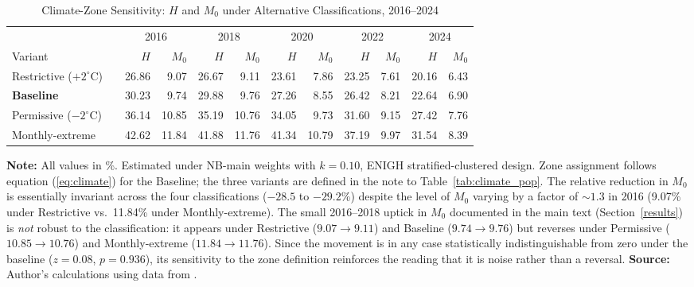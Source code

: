 \documentclass[11pt, a4paper]{article}
\begin{document}
\begin{table}[htb]
\centering
\caption{Climate-Zone Sensitivity: $H$ and $M_0$ under Alternative Classifications, 2016--2024}
\small
\begin{tabularx}{\textwidth}{l X rr rr rr rr rr}
\toprule
\toprule
& & \multicolumn{2}{c}{2016} & \multicolumn{2}{c}{2018} & \multicolumn{2}{c}{2020} & \multicolumn{2}{c}{2022} & \multicolumn{2}{c}{2024} \\
\cmidrule(lr){3-4} \cmidrule(lr){5-6} \cmidrule(lr){7-8} \cmidrule(lr){9-10} \cmidrule(lr){11-12}
Variant & & $H$ & $M_0$ & $H$ & $M_0$ & $H$ & $M_0$ & $H$ & $M_0$ & $H$ & $M_0$ \\ \midrule
Restrictive ($+2^{\circ}$C)        & & 26.86 & 9.07  & 26.67 & 9.11  & 23.61 & 7.86  & 23.25 & 7.61  & 20.16 & 6.43  \\
\textbf{Baseline}                  & & 30.23 & 9.74  & 29.88 & 9.76  & 27.26 & 8.55  & 26.42 & 8.21  & 22.64 & 6.90  \\
Permissive ($-2^{\circ}$C)         & & 36.14 & 10.85 & 35.19 & 10.76 & 34.05 & 9.73  & 31.60 & 9.15  & 27.42 & 7.76  \\
Monthly-extreme                    & & 42.62 & 11.84 & 41.88 & 11.76 & 41.34 & 10.79 & 37.19 & 9.97  & 31.54 & 8.39  \\
\bottomrule
\end{tabularx}
\begin{justify}
\scriptsize
\textbf{Note:} All values in \%. Estimated under NB-main weights with $k=0.10$, ENIGH stratified-clustered design. Zone assignment follows equation (\ref{eq:climate}) for the Baseline; the three variants are defined in the note to Table~\ref{tab:climate_pop}. The relative reduction in $M_0$ is essentially invariant across the four classifications ($-28.5$ to $-29.2$\%) despite the level of $M_0$ varying by a factor of $\sim\!1.3$ in 2016 (9.07\% under Restrictive vs.\ 11.84\% under Monthly-extreme). The small 2016--2018 uptick in $M_0$ documented in the main text (Section~\ref{results}) is \emph{not} robust to the classification: it appears under Restrictive ($9.07 \to 9.11$) and Baseline ($9.74 \to 9.76$) but reverses under Permissive ($10.85 \to 10.76$) and Monthly-extreme ($11.84 \to 11.76$). Since the movement is in any case statistically indistinguishable from zero under the baseline ($z=0.08$, $p=0.936$), its sensitivity to the zone definition reinforces the reading that it is noise rather than a reversal. \textbf{Source:} Author's calculations using data from \textcite{enigh2016, enigh2018, enigh2020, enigh2022, enigh2024}.
\end{justify}
\label{tab:climate_HM}
\end{table}
\end{document}
